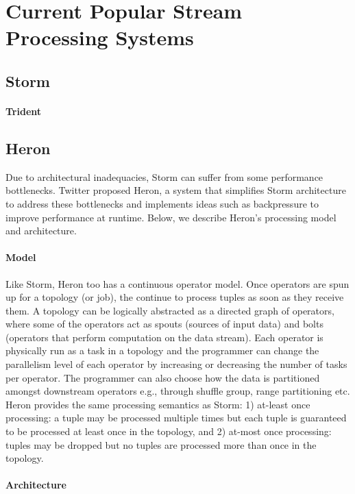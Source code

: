 \section{Current Popular Stream Processing Systems}

	
	
\subsection{Storm} %
\paragraph{Trident} 
\subsection{Heron}

Due to architectural inadequacies, Storm can suffer from some performance bottlenecks. Twitter proposed Heron, a system that simplifies Storm architecture to address these bottlenecks and implements ideas such as backpressure to improve performance at runtime. Below, we describe Heron's processing model and architecture. 

\paragraph{Model} Like Storm, Heron too has a continuous operator model. Once operators are spun up for a topology (or job), the continue to process tuples as soon as they receive them. A topology can be logically abstracted as a directed graph of operators, where some of the operators act as spouts (sources of input data) and bolts (operators that perform computation on the data stream). Each operator is physically run as a task in a topology and the programmer can change the parallelism level of each operator by increasing or decreasing the number of tasks per operator. The programmer can also choose how the data is partitioned amongst downstream operators e.g., through shuffle group, range partitioning etc. Heron provides the same processing semantics as Storm: 1) at-least once processing: a tuple may be processed multiple times but each tuple is guaranteed to be processed at least once in the topology, and 2) at-most once processing:  tuples may be dropped but no tuples are processed more than once in the topology.


\paragraph{Architecture}


